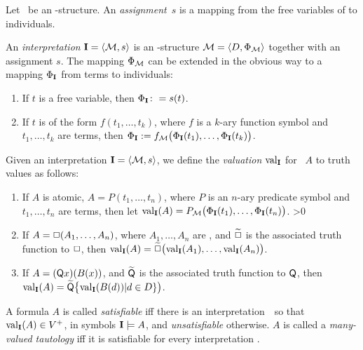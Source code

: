 \documentclass{article}
\begin{document}
   \begin{definition}
   Let \M\ be an \LL-structure. An {\em assignment\/}~$s$ is a mapping from
   the free variables of \LL to individuals.

   An {\em interpretation} $\I=\langle \M,s\rangle$ is an \LL-structure
   $\M = \langle D,\Phi_{\M}\rangle$ together with an assignment $s$.
   The mapping $\Phi_{\M}$ can be extended in the obvious way to a mapping
   $\Phi_{{\bf I}}$ from terms to individuals:
   \begin{enumerate}
   \item If $t$ is a free variable, then $\Phi_{{\bf I}}\colon = s(t)$.
   \item If $t$ is of the form $f(t_1,\ldots,t_k)$, where $f$ is a $k$-ary
         function symbol and $t_1,\ldots,t_k$ are terms, then
         $\Phi_{\I} := f_{\M}\bigl(\Phi_{\I}(t_1),\ldots,\Phi_{\I}(t_k)\bigr)$.
   \end{enumerate}
   \end{definition}

   \begin{definition}
   Given an interpretation $\I=\langle \M,s\rangle$, we define the
   {\em valuation\/} ${\rm val}_{{\bf I}}$ for \formulae\ $A$ to truth values as follows:
   \begin{enumerate}
   \item If $A$ is atomic, $A=P(t_1,\ldots,t_n)$, where $P$ is
         an $n$-ary predicate symbol and $t_1,\ldots,t_n$ are terms, then let
         $\val_{\I}(A)=P_{\M}\bigl(\Phi_{\I}(t_1),\ldots,\Phi_{\I}(t_n)\bigr)$.
   \ifnum\NoOps>0
      \item If $A=\operator(A_1,\ldots,A_n)$,
            where $A_1,\ldots,A_n$ are \formulae, and $\toperator$ is the
            associated truth function to $\operator$, then
            $\val_{\I}(A)=\toperator\bigl(\val_{\I}(A_1),\ldots,\val_{\I}(A_n)\bigr)$.
   \fi
   \item If $A=(\quantor x)(B(x))$, and $\tquantor$ is the
         associated truth function to $\quantor$, then
         $\val_{\I}(A)=\widetilde\quantor\bigl\{\val_{\I}(B(d))|d\in D\}\bigr)$.
   \end{enumerate}
   \end{definition}

   \begin{definition}
   A formula $A$ is called {\em satisfiable\/} iff there is an
   interpretation~\I\ so that ${\rm val}_{{\bf I}}(A)\in V^+$, in symbols ${\bf I}\models A$,
   and {\em unsatisfiable\/} otherwise. $A$ is called a
   {\em many-valued tautology\/} iff it is satisfiable for every
   interpretation \I.
   \end{definition}
\fi
\end{document}
